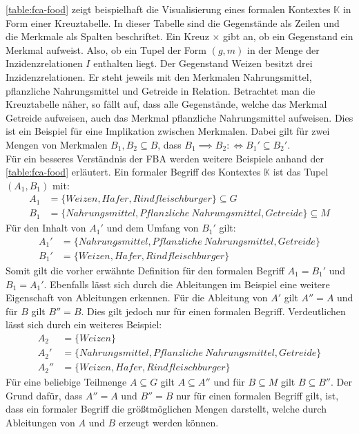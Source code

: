 \autoref{table:fca-food} zeigt beispielhaft die Visualisierung eines formalen Kontextes $\mathbb{K}$ in Form einer Kreuztabelle.
In dieser Tabelle sind die Gegenstände als Zeilen und die Merkmale als Spalten beschriftet.
Ein Kreuz $\times$ gibt an, ob ein Gegenstand ein Merkmal aufweist.
Also, ob ein Tupel der Form $(g,m)$ in der Menge der Inzidenzrelationen $I$ enthalten liegt.
Der Gegenstand Weizen besitzt drei Inzidenzrelationen.
Er steht jeweils mit den Merkmalen Nahrungsmittel, pflanzliche Nahrungsmittel und Getreide in Relation.
Betrachtet man die Kreuztabelle näher, so fällt auf, dass alle Gegenstände, welche das Merkmal Getreide aufweisen, auch das Merkmal pflanzliche Nahrungsmittel aufweisen.
Dies ist ein Beispiel für eine Implikation zwischen Merkmalen.
Dabei gilt für zwei Mengen von Merkmalen $B_1, B_2 \subseteq B$, dass $B_1\implies B_2 :\iff B_1' \subseteq B_2'$.\\

Für ein besseres Verständnis der \ac{FBA} werden weitere Beispiele anhand der \autoref{table:fca-food} erläutert.
Ein formaler Begriff des Kontextes $\mathbb{K}$ ist das Tupel $(A_1, B_1)$ mit:
\begin{align}
    A_1 & = \{Weizen, Hafer, Rindfleischburger\} \subseteq G                     \\
    B_1 & = \{Nahrungsmittel, Pflanzliche\ Nahrungsmittel,Getreide\} \subseteq M
\end{align}
Für den Inhalt von $A_1'$ und dem Umfang von $B_1'$ gilt:
\begin{align}
    A_1' & = \{Nahrungsmittel, Pflanzliche\ Nahrungsmittel, Getreide\} \\
    B_1' & = \{Weizen, Hafer, Rindfleischburger\}
\end{align}
Somit gilt die vorher erwähnte Definition für den formalen Begriff $A_1 = B_1'$ und $B_1 = A_1'$.
Ebenfalls lässt sich durch die Ableitungen im Beispiel eine weitere Eigenschaft von Ableitungen erkennen.
Für die Ableitung von $A'$ gilt $A'' = A$ und für $B$ gilt $B'' = B$.
Dies gilt jedoch nur für einen formalen Begriff.
Verdeutlichen lässt sich durch ein weiteres Beispiel:
\setcounter{equation}{0}
\begin{align}
    A_2   & = \{Weizen\}                                                \\
    A_2'  & = \{Nahrungsmittel, Pflanzliche\ Nahrungsmittel, Getreide\} \\
    A_2'' & = \{Weizen, Hafer, Rindfleischburger\}
\end{align}
Für eine beliebige Teilmenge $A \subseteq G$ gilt $A \subseteq A''$ und für $B \subseteq M$ gilt $B \subseteq B''$.
Der Grund dafür, dass $A'' = A$ und $B'' = B$ nur für einen formalen Begriff gilt, ist, dass ein formaler Begriff die größtmöglichen Mengen darstellt, welche durch Ableitungen von $A$ und $B$ erzeugt werden können.

